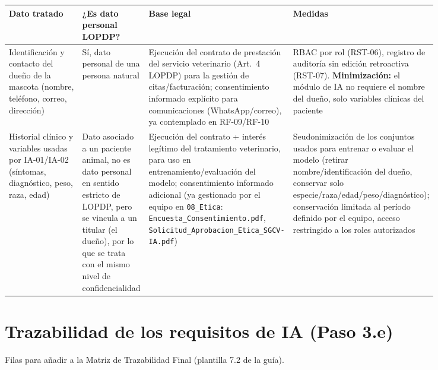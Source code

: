 \begin{longtable}{@{}>{\raggedright\arraybackslash}p{0.20\linewidth} >{\raggedright\arraybackslash}p{0.14\linewidth} >{\raggedright\arraybackslash}p{0.25\linewidth} >{\raggedright\arraybackslash}p{0.25\linewidth}@{}}
\toprule
\textbf{Dato tratado} & \textbf{¿Es dato personal LOPDP?} & \textbf{Base legal} & \textbf{Medidas} \\
\midrule
\endhead
\bottomrule
\endlastfoot

Identificación y contacto del dueño de la mascota (nombre, teléfono, correo, dirección) &
Sí, dato personal de una persona natural &
Ejecución del contrato de prestación del servicio veterinario (Art.\ 4 LOPDP) para la gestión de citas/facturación; consentimiento informado explícito para comunicaciones (WhatsApp/correo), ya contemplado en RF-09/RF-10 &
RBAC por rol (RST-06), registro de auditoría sin edición retroactiva (RST-07). \textbf{Minimización:} el módulo de IA no requiere el nombre del dueño, solo variables clínicas del paciente \\[6pt]

Historial clínico y variables usadas por IA-01/IA-02 (síntomas, diagnóstico, peso, raza, edad) &
Dato asociado a un paciente animal, no es dato personal en sentido estricto de LOPDP, pero se vincula a un titular (el dueño), por lo que se trata con el mismo nivel de confidencialidad &
Ejecución del contrato + interés legítimo del tratamiento veterinario, para uso en entrenamiento/evaluación del modelo; consentimiento informado adicional (ya gestionado por el equipo en \texttt{08\_Etica}: \texttt{Encuesta\_Consentimiento.pdf}, \texttt{Solicitud\_Aprobacion\_Etica\_SGCV-IA.pdf}) &
Seudonimización de los conjuntos usados para entrenar o evaluar el modelo (retirar nombre/identificación del dueño, conservar solo especie/raza/edad/peso/diagnóstico); conservación limitada al período definido por el equipo, acceso restringido a los roles autorizados \\

\end{longtable}

\section{Trazabilidad de los requisitos de IA (Paso 3.e)}
\label{sec:trazabilidad-ia}

Filas para añadir a la Matriz de Trazabilidad Final (plantilla 7.2 de la guía).

